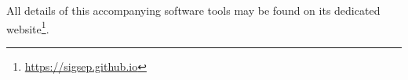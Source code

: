 


All details of this accompanying software tools may be found on its dedicated website\footnote{\url{https://sigsep.github.io}}.